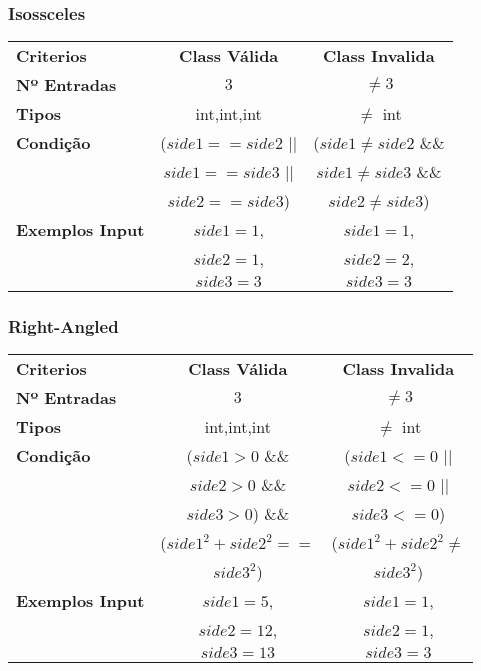 \subsubsection{Isossceles}
\begin{center}
  \begin{tabular}{lcc}
    \textbf{Criterios}  & \textbf{Class Válida} & \textbf{Class Invalida} \\
    \textbf{Nº Entradas} & $ 3 $ & $ \ne 3 $ \\
    \textbf{Tipos}       & int,int,int & $\ne$ int \\
    \textbf{Condição}
    & ($side1==side2$ || & ($side1 \ne side2$ \&\& \\
    & $side1==side3$ ||  & $side1 \ne side3$ \&\& \\
    & $side2==side3$)    & $side2 \ne side3$) \\
    \textbf{Exemplos Input}
    & $side1=1$, & $side1=1$, \\
    & $side2=1$, & $side2=2$, \\
    & $side3=3$ & $side3=3$ \\
  \end{tabular}
\end{center}


\subsubsection{Right-Angled}
\begin{center}
  \begin{tabular}{lcc}
    \textbf{Criterios}  & \textbf{Class Válida} & \textbf{Class Invalida} \\
    \textbf{Nº Entradas} & $ 3 $ & $ \ne 3 $ \\
    \textbf{Tipos} & int,int,int & $\ne$ int  \\
    \textbf{Condição}
    & ($side1 > 0$ \&\&        & ($side1 <= 0$ || \\
    & $side2 > 0$ \&\&         & $side2<= 0$ || \\
    & $side3 > 0$) \&\&        & $side3 <= 0$) \\
    & ($side1^2 + side2^2 == $ & ($side1^2 +side2^2 \ne$ \\
    & $side3^2$)               & $side3^2$) \\
    \textbf{Exemplos Input}
    & $side1=5$, & $side1=1$, \\
    & $side2=12$, & $side2=1$, \\
    & $side3=13$  & $side3=3$
  \end{tabular}
\end{center}

